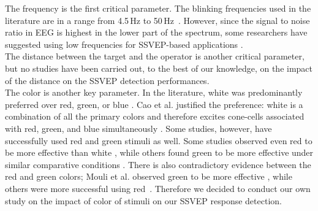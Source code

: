 \documentclass[smallextended]{svjour3}
\begin{document}
The frequency is the first critical parameter. The blinking frequencies used in the literature are in a range from 4.5\,Hz to 50\,Hz~\cite{Zhu2010}. However, since the signal to noise ratio in EEG is highest in the lower part of the spectrum, some researchers have suggested using low frequencies for SSVEP-based applications \cite{paper6}.\\
The distance between the target and the operator is another critical parameter, but no studies have been carried out, to the best of our knowledge, on the impact of the distance on the SSVEP detection performances.\\
The color is another key parameter. In the literature, white was predominantly preferred over red, green, or blue \cite{paper6,aljshamee2014beyond,aljshamee2016discriminate,cao2012flashing,paper2}. Cao et al. justified the preference: white is a combination of all the primary colors and therefore excites cone-cells associated with red, green, and blue simultaneously \cite{cao2012flashing}. 
Some studies, however, have successfully used red \cite{Faller2010,jian2014improving,paper4} and green \cite{chua2004effects,duvinage2013performance,SSVEPfiability,hvaring2014comparison,paper4,mouli2013performance} stimuli as well. Some studies observed even red to be more effective than white \cite{Faller2010,hvaring2014comparison}, while others found green to be more effective under similar comparative conditions \cite{chua2004effects,duvinage2013performance}. 
There is also contradictory evidence between the red and green colors; Mouli et al. observed green to be more effective \cite{mouli2013performance}, while others were more successful using red~\cite{cao2012flashing}. Therefore we decided to conduct our own study on the impact of color of stimuli on our SSVEP response detection.


\end{document}
